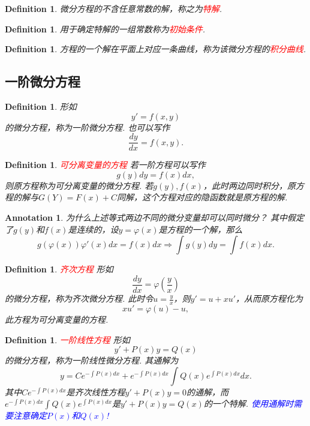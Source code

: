 \documentclass{article}
\newtheorem{definition}[theorem]{Definition}
\newtheorem{annotation}[theorem]{Annotation}
\newcommand{\redt}[1]{\textcolor{red}{#1}}
\newcommand{\bluet}[1]{\textcolor{blue}{#1}}
\begin{document}
\begin{definition}
\rm 微分方程的不含任意常数的解，称之为\redt{特解}.
\end{definition}

\begin{definition}
\rm 用于确定特解的一组常数称为\redt{初始条件}. 
\end{definition}

\begin{definition}
\rm 方程的一个解在平面上对应一条曲线，称为该微分方程的\redt{积分曲线}. 
\end{definition}

\subsection{一阶微分方程}

\begin{definition}
\rm 形如
$$
y'=f(x,y)
$$
的微分方程，称为一阶微分方程. 也可以写作
$$
\frac{dy}{dx} = f(x,y).
$$
\end{definition}

\begin{definition}
\rm \redt{可分离变量的方程} 若一阶方程可以写作
$$
g(y)dy = f(x)dx,
$$
则原方程称为可分离变量的微分方程. 若$g(y),f(x)$，此时两边同时积分，原方程的解与$G(Y)=F(x)+C$同解，这个方程对应的隐函数就是原方程的解.
\end{definition}

\begin{annotation}
\rm 为什么上述等式两边不同的微分变量却可以同时微分？ 其中假定了$g(y)$和$f(x)$是连续的，设$y = \varphi(x)$是方程的一个解，那么
$$
 g(\varphi(x))\varphi'(x)dx = f(x)dx \Rightarrow \int g(y)dy = \int f(x)dx.  
$$

\end{annotation}

\begin{definition}
\rm \redt{齐次方程} 形如
$$
\frac{dy}{dx} = \varphi\left(\frac{y}{x}\right)
$$
的微分方程，称为齐次微分方程. 此时令$u = \frac{y}{x}$，则$y' = u+xu'$，从而原方程化为
$$
xu' = \varphi(u) - u,
$$
此方程为可分离变量的方程. 
\end{definition}

\begin{definition}
\rm \redt{一阶线性方程} 形如
$$
y'+P(x)y = Q(x)
$$
的微分方程，称为一阶线性微分方程. 其通解为
$$
y= Ce^{-\int P(x)dx } + e^{-\int P(x)dx }\int Q(x)e^{\int P(x)dx}dx. 
$$
其中$Ce^{-\int P(x)dx }$是齐次线性方程$y'+P(x)y=0$的通解，而$e^{-\int P(x)dx }\int Q(x)e^{\int P(x)dx}$是$y'+P(x)y=Q(x)$的一个特解. \bluet{使用通解时需要注意确定$P(x)$和$Q(x)$!}
\end{definition}
\end{document}
